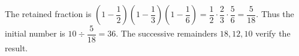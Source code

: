 The retained fraction is $(1-\dfrac{1}{2})(1-\dfrac{1}{3})(1-\dfrac{1}{6})=\dfrac{1}{2}\cdot\dfrac{2}{3}\cdot\dfrac{5}{6}=\dfrac{5}{18}$. Thus the initial number is $10\div\dfrac{5}{18}=\boxed{36}$. The successive remainders $18,12,10$ verify the result.
